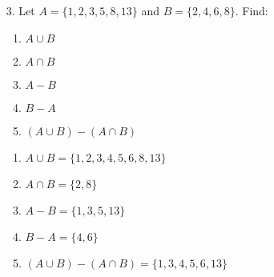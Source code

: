 \begin{enumerate}
    \item[3.]    
    Let $A = \{1, 2, 3, 5, 8, 13\}$ and $B = \{2, 4, 6, 8\}$. Find:
    \begin{enumerate}
        \item $A \cup B$
        \item $A \cap B$
        \item $A - B$
        \item $B - A$
        \item $(A \cup B) - (A \cap B)$
    \end{enumerate}
    \begin{solutiondraft}
        \begin{center}\end{center}
        \begin{enumerate}
            \item $A \cup B = \{
                1, 2, 3, 4, 5, 6, 8, 13
            \}$
            \item $A \cap B = \{
                2,8
            \}$
            \item $A - B = \{
                1, 3, 5, 13
            \}$
            \item $B - A = \{
                4, 6
            \}$
            \item $(A \cup B) - (A \cap B) = \{
                1, 3, 4, 5, 6, 13
            \}$
        \end{enumerate}
    \end{solutiondraft}
    \begin{comment}
        here is where you type in your explain.
    \end{comment}




\end{enumerate}
